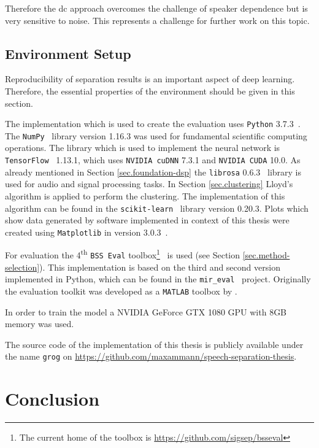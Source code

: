 Therefore the \gls{dc} approach overcomes the challenge of speaker dependence but is very sensitive to noise. This represents a challenge for further work on this topic.


\section{Environment Setup}\label{sec.environment}

Reproducibility of separation results is an important aspect of deep learning. Therefore, the essential properties of the environment should be given in this section.

The implementation which is used to create the evaluation uses \texttt{Python} 3.7.3~\cite{PSF}.
The \texttt{NumPy}~\cite{Oliphant2006} library version 1.16.3 was used for fundamental scientific computing operations.
The library which is used to implement the neural network is \texttt{TensorFlow}~\cite{Abadi2016} 1.13.1, which uses \texttt{NVIDIA cuDNN} 7.3.1 and \texttt{NVIDIA CUDA} 10.0.
As already mentioned in Section \ref{sec.foundation-dsp} the \texttt{librosa} 0.6.3~\cite{McFee2019} library is used for audio and signal processing tasks.
In Section \ref{sec.clustering} Lloyd's algorithm is applied to perform the clustering. The implementation of this algorithm can be found in the \texttt{scikit-learn}~\cite{Pedregosa2011} library version 0.20.3.
Plots which show data generated by software implemented in context of this thesis  were created using \texttt{Matplotlib} in version 3.0.3~\cite{Hunter2007}.

For evaluation the 4\textsuperscript{th} \texttt{BSS Eval} toolbox\footnote{The current home of the toolbox is \url{https://github.com/sigsep/bsseval}}~\cite{Stoeter2018} is used (see Section \ref{sec.method-selection}).
This implementation is based on the third and second version implemented in Python, which can be found in the \texttt{mir\_eval}~\cite{Raffel2014} project.
Originally the evaluation toolkit was developed as a \texttt{MATLAB} toolbox by \textcite{Fevotte2005}.

In order to train the model a NVIDIA GeForce GTX 1080 GPU with 8GB memory was used.

The source code of the implementation of this thesis is publicly available under the name \texttt{grog} on \url{https://github.com/maxammann/speech-separation-thesis}.

\chapter{Conclusion}


